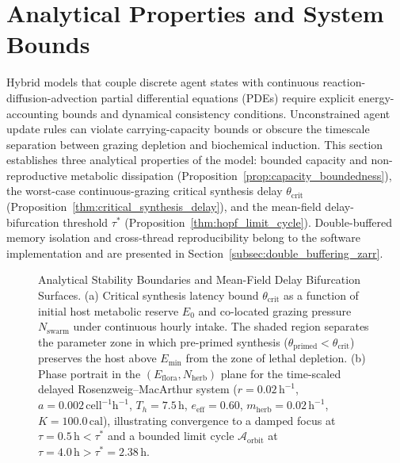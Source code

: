 
\section{Analytical Properties and System Bounds}
\label{sec:theoretical_invariants}

Hybrid models that couple discrete agent states with continuous reaction-diffusion-advection partial differential equations (PDEs) require explicit energy-accounting bounds and dynamical consistency conditions. Unconstrained agent update rules can violate carrying-capacity bounds or obscure the timescale separation between grazing depletion and biochemical induction. This section establishes three analytical properties of the model: bounded capacity and non-reproductive metabolic dissipation (Proposition~\ref{prop:capacity_boundedness}), the worst-case continuous-grazing critical synthesis delay $\theta_{\mathrm{crit}}$ (Proposition~\ref{thm:critical_synthesis_delay}), and the mean-field delay-bifurcation threshold $\tau^*$ (Proposition~\ref{thm:hopf_limit_cycle}). Double-buffered memory isolation and cross-thread reproducibility belong to the software implementation and are presented in Section~\ref{subsec:double_buffering_zarr}.

\begin{figure}[t]
  \centering
  
  \caption{Analytical Stability Boundaries and Mean-Field Delay Bifurcation Surfaces. (a) Critical synthesis latency bound $\theta_{\mathrm{crit}}$ as a function of initial host metabolic reserve $E_0$ and co-located grazing pressure $N_{\mathrm{swarm}}$ under continuous hourly intake. The shaded region separates the parameter zone in which pre-primed synthesis ($\theta_{\mathrm{primed}} < \theta_{\mathrm{crit}}$) preserves the host above $E_{\min}$ from the zone of lethal depletion. (b) Phase portrait in the $(E_{\mathrm{flora}}, N_{\mathrm{herb}})$ plane for the time-scaled delayed Rosenzweig--MacArthur system ($r = 0.02\,\mathrm{h}^{-1}$, $a = 0.002\,\mathrm{cell}^{-1}\mathrm{h}^{-1}$, $T_h = 7.5\,\mathrm{h}$, $e_{\mathrm{eff}} = 0.60$, $m_{\mathrm{herb}} = 0.02\,\mathrm{h}^{-1}$, $K = 100.0\,\mathrm{cal}$), illustrating convergence to a damped focus at $\tau = 0.5\,\mathrm{h} < \tau^*$ and a bounded limit cycle $\mathcal{A}_{\mathrm{orbit}}$ at $\tau = 4.0\,\mathrm{h} > \tau^* = 2.38\,\mathrm{h}$.}
  \label{fig:limit_cycle_bifurcation}
\end{figure}

